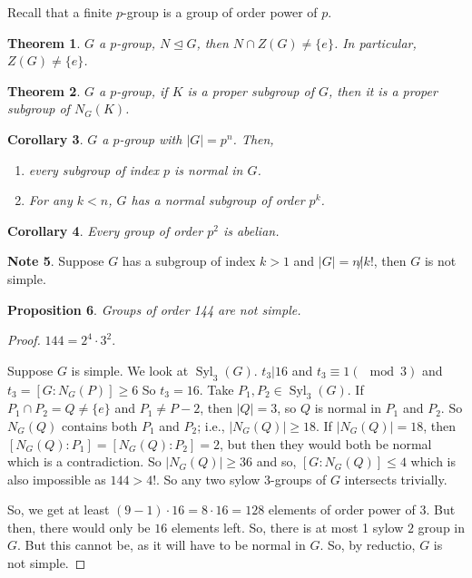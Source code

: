 \documentclass{amsart}
\newtheorem{thm}{Theorem}[section]
\newtheorem{prop}[thm]{Proposition}
\newtheorem{cor}[thm]{Corollary}
\theoremstyle{definition}
\newtheorem{note}[thm]{Note}
\DeclareMathOperator{\Syl}{Syl}
\begin{document}
Recall that a finite $p$-group is a group of order power of $p$.
\begin{thm}
	$G$ a $p$-group, $N\unlhd G$, then $N\cap Z(G)\not=\{e\}$. In particular, $Z(G)\not=\{e\}$.
\end{thm}
\begin{thm}
	$G$ a $p$-group, if $K$ is a proper subgroup of $G$, then  it is a proper subgroup of $N_G(K)$.
\end{thm}
\begin{cor}
	$G$ a $p$-group with $|G|=p^n$. Then,
	\begin{enumerate}
		\item every subgroup of index $p$ is normal in $G$.
		\item For any $k<n$, $G$ has a normal subgroup of order $p^k$.
	\end{enumerate}
\end{cor}
\begin{cor}
	Every group of order $p^2$ is abelian.
\end{cor}
\begin{note}
	Suppose $G$ has a subgroup of index $k>1$ and $|G|=n\not|k!$, then $G$ is not simple.
\end{note}
\begin{prop}
	Groups of order 144 are not simple.
\end{prop}
\begin{proof}
	$144=2^4\cdot 3^2$.
	
	Suppose $G$ is simple. We look at $\Syl_3(G)$. $t_3|16$ and $t_3\equiv 1(\mod 3)$ and $t_3=[G:N_G(P)]\geq 6$ So $t_3=16$. Take $P_1,P_2\in \Syl_3(G)$. If $P_1\cap  P_2=Q\not=\{e\}$ and $P_1\not= P-2$, then $|Q|=3$, so $Q$ is normal in $P_1$ and $P_2$. So $N_G(Q)$ contains both $P_1$ and $P_2$; i.e., $|N_G(Q)|\geq 18$. If $|N_G(Q)|=18$, then $[N_G(Q):P_1]=[N_G(Q):P_2]=2$, but then they would both be normal which is a contradiction. So $|N_G(Q)|\geq 36$ and so, $[G:N_G(Q)]\leq 4$ which is also impossible as $144>4!$. So any two sylow 3-groups of $G$ intersects trivially.
	
	So, we get at least $(9-1)\cdot 16=8\cdot 16=128$ elements of order power of 3. But then, there would only be $16$ elements left. So, there is at most 1 sylow $2$ group in $G$. But this cannot be, as it will have to be normal in $G$. So, by reductio, $G$ is not simple. 
\end{proof}
\end{document}

